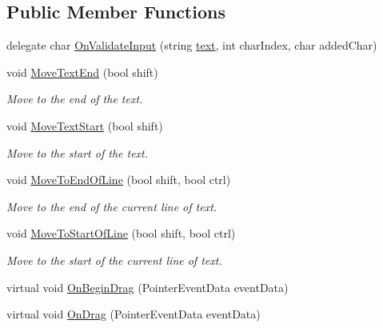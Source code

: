 \subsection*{Public Member Functions}
\begin{DoxyCompactItemize}
\item 
delegate char \mbox{\hyperlink{class_t_m_pro_1_1_t_m_p___input_field_a34dece90fcdb81bf3489208eab7a8a82}{On\+Validate\+Input}} (string \mbox{\hyperlink{class_t_m_pro_1_1_t_m_p___input_field_ab89ad02ff00c4c076c5bd3303528e5de}{text}}, int char\+Index, char added\+Char)
\item 
void \mbox{\hyperlink{class_t_m_pro_1_1_t_m_p___input_field_a0470349eb9f2156696cd6a921b558ba7}{Move\+Text\+End}} (bool shift)
\begin{DoxyCompactList}\small\item\em Move to the end of the text. \end{DoxyCompactList}\item 
void \mbox{\hyperlink{class_t_m_pro_1_1_t_m_p___input_field_aff69df0c224c73b666addf48c10eec44}{Move\+Text\+Start}} (bool shift)
\begin{DoxyCompactList}\small\item\em Move to the start of the text. \end{DoxyCompactList}\item 
void \mbox{\hyperlink{class_t_m_pro_1_1_t_m_p___input_field_a817cdcf34d7711275ffa8643b02a73fa}{Move\+To\+End\+Of\+Line}} (bool shift, bool ctrl)
\begin{DoxyCompactList}\small\item\em Move to the end of the current line of text. \end{DoxyCompactList}\item 
void \mbox{\hyperlink{class_t_m_pro_1_1_t_m_p___input_field_ad0c485854da42ede16b5127258120c40}{Move\+To\+Start\+Of\+Line}} (bool shift, bool ctrl)
\begin{DoxyCompactList}\small\item\em Move to the start of the current line of text. \end{DoxyCompactList}\item 
virtual void \mbox{\hyperlink{class_t_m_pro_1_1_t_m_p___input_field_afb0884739580ae97b441c56b1018786a}{On\+Begin\+Drag}} (Pointer\+Event\+Data event\+Data)
\item 
virtual void \mbox{\hyperlink{class_t_m_pro_1_1_t_m_p___input_field_ad670bf0eee71dbabbe95948062a0fea2}{On\+Drag}} (Pointer\+Event\+Data event\+Data)
\item 

\end{DoxyCompactItemize}
